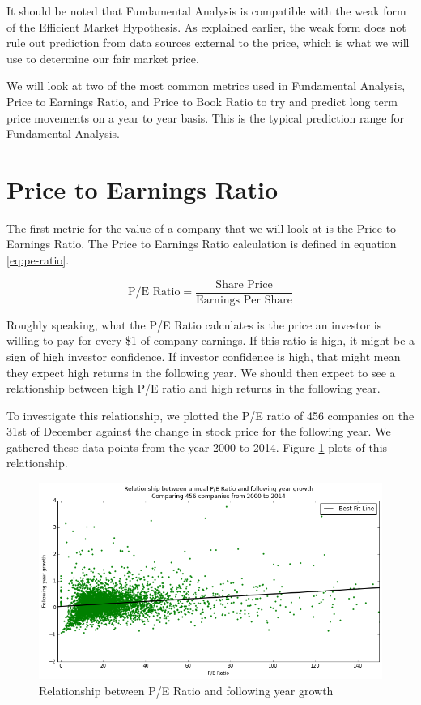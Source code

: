 \documentclass{report}
\begin{document}
It should be noted that Fundamental Analysis is compatible with the weak form of the Efficient Market Hypothesis. As explained earlier, the weak form does not rule out prediction from data sources external to the price, which is what we will use to determine our fair market price.

We will look at two of the most common metrics used in Fundamental Analysis, Price to Earnings Ratio, and Price to Book Ratio to try and predict long term price movements on a year to year basis. This is the typical prediction range for Fundamental Analysis.

\section{Price to Earnings Ratio}

The first metric for the value of a company that we will look at is the Price to Earnings Ratio. The Price to Earnings Ratio calculation is defined in equation \ref{eq:pe-ratio}.

\begin{center}
\begin{equation}
  \text{P/E Ratio} = \dfrac{\text{Share Price}}{\text{Earnings Per Share}}
\end{equation}
\label{eq:pe-ratio}  
\end{center}

Roughly speaking, what the P/E Ratio calculates is the price an investor is willing to pay for every \$1 of company earnings. If this ratio is high, it might be a sign of high investor confidence. If investor confidence is high, that might mean they expect high returns in the following year. We should then expect to see a relationship between high P/E ratio and high returns in the following year.

To investigate this relationship, we plotted the P/E ratio of 456 companies on the 31st of December against the change in stock price for the following year. We gathered these data points from the year 2000 to 2014. Figure \ref{fig:pe-abs} plots of this relationship.

\begin{figure}[H]
	\caption{Relationship between P/E Ratio and following year growth}
	\centerline{\includegraphics[width=\textwidth]{vis/pe-ratio-abs.png}}
	\label{fig:pe-abs}
\end{figure}
\end{document}
